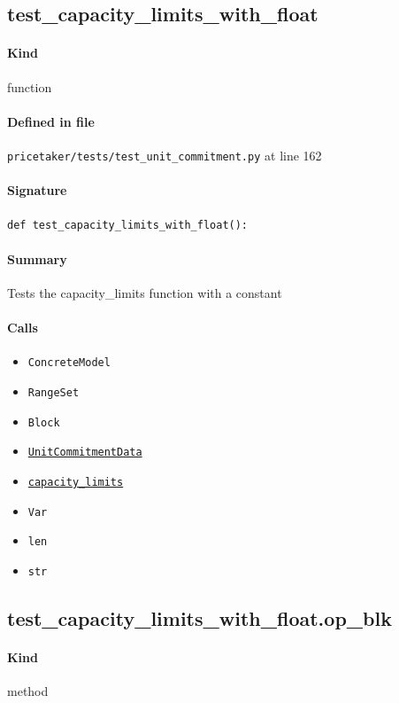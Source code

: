 \documentclass[11pt]{report}
\begin{document}
\subsection{test\_capacity\_limits\_with\_float}
\label{def:pricetaker-tests-test_unit_commitment.py:test_capacity_limits_with_float:L162}
\paragraph{Kind} function
\paragraph{Defined in file} \texttt{pricetaker/tests/test\_unit\_commitment.py} at line 162
\paragraph{Signature} \texttt{def test\_capacity\_limits\_with\_float():}
\paragraph{Summary} Tests the capacity\_limits function with a constant
\paragraph{Calls}
\begin{itemize}[leftmargin=*]
  \item \texttt{ConcreteModel}
  \item \texttt{RangeSet}
  \item \texttt{Block}
  \item \hyperref[def:pricetaker-unit_commitment.py:UnitCommitmentData:L26]{\texttt{UnitCommitmentData}}
  \item \hyperref[def:pricetaker-unit_commitment.py:capacity_limits:L180]{\texttt{capacity\_limits}}
  \item \texttt{Var}
  \item \texttt{len}
  \item \texttt{str}
\end{itemize}
\subsection{test\_capacity\_limits\_with\_float.op\_blk}
\label{def:pricetaker-tests-test_unit_commitment.py:test_capacity_limits_with_float.op_blk:L171}
\paragraph{Kind} method
\end{document}
